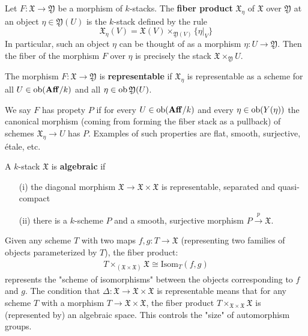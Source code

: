 \documentclass[12pt]{article}
\begin{document}
\begin{definition}
    Let $F: \mathfrak{X} \to \mathfrak{Y}$ be a morphism of $k$-stacks. The \textbf{fiber product} $\mathfrak{X}_\eta$ of $\mathfrak{X}$ over $\mathfrak{Y}$ at an object $\eta \in \mathfrak{Y}(U)$ is the $k$-stack defined by the rule
    \[
        \mathfrak{X}_\eta(V) = \mathfrak{X}(V) \times_{\mathfrak{Y}(V)} \{\eta|_V\}
    \]
    In particular, such an object $\eta$ can be thought of as a morphism $\eta: U \to \mathfrak{Y}$. Then the fiber of the morphism $F$ over $\eta$ is precisely the stack $\mathfrak{X} \times_{\mathfrak{Y}} U$.

    The morphism $F: \mathfrak{X} \to \mathfrak{Y}$ is \textbf{representable} if $\mathfrak{X}_\eta$ is representable as a scheme for all $U \in \operatorname{ob}(\mathbf{Aff}/k)$ and all $\eta \in \operatorname{ob}\mathfrak{Y}(U)$.



    We say $F$ has propety $P$ if for every $U \in \operatorname{ob}(\mathbf{Aff}/k)$ and every $\eta \in \operatorname{ob}(Y(\eta))$ the canonical morphism (coming from forming the fiber stack as a pullback) of schemes $\mathfrak{X}_\eta \to U$ has $P$.  Examples of such properties are flat, smooth, surjective, étale, etc.
\end{definition}

\begin{definition}
    A $k$-stack $\mathfrak{X}$ is \textbf{algebraic} if
    \begin{enumerate}
        \item[(i)] the diagonal morphism $\mathfrak{X} \to \mathfrak{X} \times \mathfrak{X}$ is representable, separated and quasi-compact
        \item[(ii)] there is a $k$-scheme $P$ and a smooth, surjective morphism $P \stackrel{p}{\to} \mathfrak{X}$.
    \end{enumerate}
\end{definition}

\begin{remark}
    Given any scheme $T$ with two maps $f, g : T \to \mathfrak{X}$ (representing two families of objects parameterized by $T$), the fiber product:
    \begin{align*}
        T \times_{(\mathfrak{X} \times \mathfrak{X})} \mathfrak{X} \cong \text{Isom}_T(f, g)
    \end{align*}
    represents the "scheme of isomorphisms" between the objects corresponding to $f$ and $g$.    The condition that $\Delta : \mathfrak{X} \to \mathfrak{X} \times \mathfrak{X}$ is representable means that for any scheme $T$ with a morphism $T \to \mathfrak{X} \times \mathfrak{X}$, the fiber product $T \times_{\mathfrak{X} \times \mathfrak{X}} \mathfrak{X}$ is (represented by) an algebraic space. This controls the "size" of automorphism groups.
\end{remark}
\end{document}
